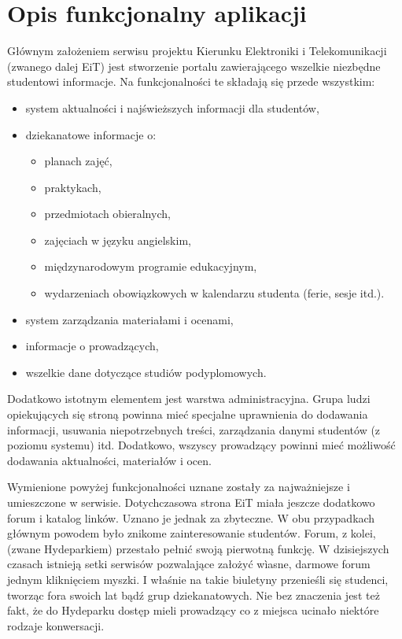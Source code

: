 \documentclass[a4paper,12pt,oneside]{report}
\begin{document}
\section{Opis funkcjonalny aplikacji}
\label{sec:funkcjonalny}
Głównym założeniem serwisu projektu Kierunku Elektroniki i Telekomunikacji (zwanego dalej EiT) jest stworzenie portalu zawierającego wszelkie niezbędne studentowi informacje. Na funkcjonalności te składają się przede wszystkim:
\begin{itemize}
  \item system aktualności i najświeższych informacji dla studentów,
  \item dziekanatowe informacje o:
  \begin{itemize}
    \item planach zajęć,
    \item praktykach,
    \item przedmiotach obieralnych,
    \item zajęciach w języku angielskim,
    \item międzynarodowym programie edukacyjnym,
    \item wydarzeniach obowiązkowych w kalendarzu studenta (ferie, sesje itd.).
  \end{itemize}
  \item system zarządzania materiałami i ocenami,
  \item informacje o prowadzących,
  \item wszelkie dane dotyczące studiów podyplomowych.
\end{itemize}
Dodatkowo istotnym elementem jest warstwa administracyjna. Grupa ludzi opiekujących się stroną powinna mieć specjalne uprawnienia do dodawania informacji, usuwania niepotrzebnych treści, zarządzania danymi studentów (z poziomu systemu) itd. Dodatkowo, wszyscy prowadzący powinni mieć możliwość dodawania aktualności, materiałów i ocen. 

Wymienione powyżej funkcjonalności uznane zostały za najważniejsze i umieszczone w serwisie. Dotychczasowa strona EiT miała jeszcze dodatkowo forum i katalog linków. Uznano je jednak za zbyteczne. W obu przypadkach głównym powodem było znikome zainteresowanie studentów. Forum, z kolei, (zwane Hydeparkiem) przestało pełnić swoją pierwotną funkcję. W dzisiejszych czasach istnieją setki serwisów pozwalające założyć wìasne, darmowe forum jednym kliknięciem myszki. I właśnie na takie biuletyny przenieśli się studenci, tworząc fora swoich lat bądź grup dziekanatowych. Nie bez znaczenia jest też fakt, że do Hydeparku dostęp mieli prowadzący co z miejsca ucinało niektóre rodzaje konwersacji.
\end{document}
